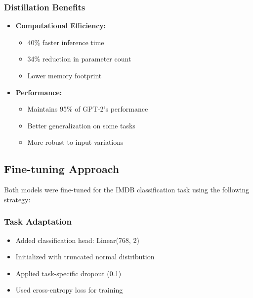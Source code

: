 \documentclass[11pt]{article}
\begin{document}
\subsubsection{Distillation Benefits}
\begin{itemize}
  \item \textbf{Computational Efficiency:}
    \begin{itemize}
      \item 40\% faster inference time
      \item 34\% reduction in parameter count
      \item Lower memory footprint
    \end{itemize}
  \item \textbf{Performance:}
    \begin{itemize}
      \item Maintains 95\% of GPT-2's performance
      \item Better generalization on some tasks
      \item More robust to input variations
    \end{itemize}
\end{itemize}

\subsection{Fine-tuning Approach}
Both models were fine-tuned for the IMDB classification task using the following strategy:

\subsubsection{Task Adaptation}
\begin{itemize}
  \item Added classification head: Linear(768, 2)
  \item Initialized with truncated normal distribution
  \item Applied task-specific dropout (0.1)
  \item Used cross-entropy loss for training
\end{itemize}
\end{document}
